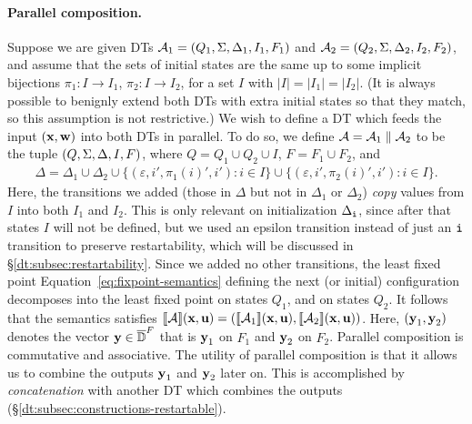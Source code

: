 \paragraph*{Parallel composition.}
Suppose we are given DTs $\mathcal{A}_1 = (Q_{1}, \Sigma, \Delta_{1}, I_{1}, F_{1})$ and $\mathcal{A}_2 = (Q_{2}, \Sigma, \Delta_{2}, I_{2}, F_{2})$, and assume that the sets of initial states are the same up to some implicit bijections $\pi_1: I \to I_1$, $\pi_2: I \to I_2$, for a set $I$ with $|I| = |I_1| = |I_2|$. (It is always possible to benignly extend both DTs with extra initial states so that they match, so this assumption is not restrictive.)
We wish to define a DT which feeds the input $(\textbf{x},\textbf{w})$ into both DTs in parallel. To do so, we define $\mathcal{A} = \mathcal{A}_1 \; \| \; \mathcal{A}_2$ to be the tuple $(Q, \Sigma, \Delta, I, F){}$, where $Q = Q_1 \cup Q_2 \cup I$, $F = F_1 \cup F_2$, and
\begin{align*}
\Delta = \Delta_1 \cup \Delta_2
    \cup \big\{(\varepsilon, i', \pi_1(i)', i') : i \in I \big\}
    \cup \big\{(\varepsilon, i', \pi_2(i)', i') : i \in I \big\}.
\end{align*}
Here, the transitions we added (those in $\Delta$ but not in $\Delta_1$ or $\Delta_2$) \emph{copy} values from $I$ into both $I_1$ and $I_2$. This is only relevant on initialization $\Delta_{\texttt{i}}$, since after that states $I$ will not be defined, but we used an epsilon transition instead of just an ${\texttt{i}}$ transition to preserve restartability, which will be discussed in \S\ref{dt:subsec:restartability}. Since we added no other transitions, the least fixed point Equation~\eqref{eq:fixpoint-semantics} defining the next (or initial) configuration decomposes into the least fixed point on states $Q_1$, and on states $Q_2$. It follows that the semantics satisfies $\llbracket \mathcal{A} \rrbracket(\textbf{x},\textbf{u}) = (\llbracket \mathcal{A}_1 \rrbracket(\textbf{x},\textbf{u}),\llbracket \mathcal{A}_2 \rrbracket(\textbf{x},\textbf{u}))$. Here, $(\textbf{y}_1,\textbf{y}_2)$ denotes the vector $\textbf{y} \in \overline{\mathbb{D}{}}^F$ that is $\textbf{y}_1$ on $F_1$ and $\textbf{y}_2$ on $F_2$.
Parallel composition is commutative and associative.
The utility of parallel composition is that it allows us to combine the outputs $\textbf{y}_1$ and $\textbf{y}_2$ later on. This is accomplished by \emph{concatenation} with another DT which combines the outputs (\S\ref{dt:subsec:constructions-restartable}).

\begin{figure*}[h]

\label{dt:fig:parallel-composition}
\end{figure*}

